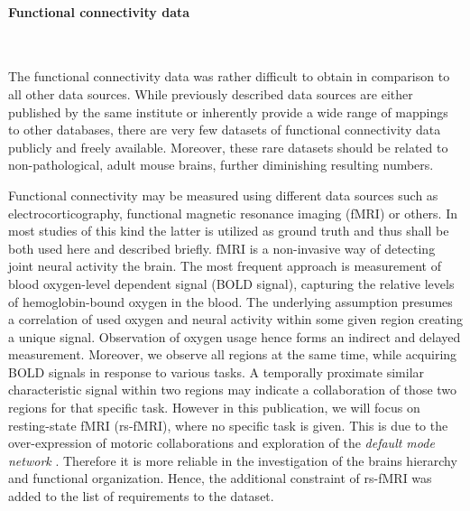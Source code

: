 \documentclass[]{article}
\renewcommand{\cite}{\citep}
\begin{document}
\paragraph{Functional connectivity data} \mbox{}\\
\label{sec:fun_conn}

The functional connectivity data was rather difficult to obtain in comparison to all other data sources. While previously described data sources are either published by the same institute or inherently provide a wide range of mappings to other databases, there are very few datasets of functional connectivity data publicly and freely available. Moreover, these rare datasets should be related to non-pathological, adult mouse brains, further diminishing resulting numbers. 

Functional connectivity may be measured using different data sources such as electrocorticography, functional magnetic resonance imaging (fMRI) or others. In most studies of this kind the latter is utilized as ground truth and thus shall be both used here and described briefly.
fMRI is a non-invasive way of detecting joint neural activity the brain. The most frequent approach is measurement of blood oxygen-level dependent signal (BOLD signal), capturing the relative levels of hemoglobin-bound oxygen in the blood. The underlying assumption presumes a correlation of used oxygen and neural activity within some given region creating a unique signal. Observation of oxygen usage hence forms an indirect and delayed measurement. Moreover, we observe all regions at the same time, while acquiring BOLD signals in response to various tasks. A temporally proximate similar characteristic signal within two regions may indicate a collaboration of those two regions for that specific task. 
However in this publication, we will focus on resting-state fMRI (rs-fMRI), where no specific task is given. This is due to the over-expression of motoric collaborations and exploration of the \textit{default mode network} \cite{sporns2016networks}. Therefore it is more reliable in the investigation of the brains hierarchy and functional organization. Hence, the additional constraint of rs-fMRI was added to the list of requirements to the dataset.\\
\end{document}
